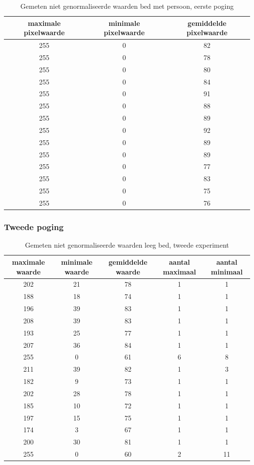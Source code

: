 \begin{table}[hbp]
	\begin{tabular}{|c|c|c|}
		\hline
		maximale pixelwaarde & minimale pixelwaarde & gemiddelde pixelwaarde \\ \hline
		255 & 0 & 82 \\ \hline
		255 & 0 & 78 \\ \hline
		255 & 0 & 80 \\ \hline
		255 & 0 & 84 \\ \hline
		255 & 0 & 91 \\ \hline
		255 & 0 & 88 \\ \hline
		255 & 0 & 89 \\ \hline
		255 & 0 & 92 \\ \hline
		255 & 0 & 89 \\ \hline
		255 & 0 & 89 \\ \hline
		255 & 0 & 77 \\ \hline
		255 & 0 & 83 \\ \hline
		255 & 0 & 75 \\ \hline
		255 & 0 & 76 \\ \hline
	\end{tabular}
	\caption{Gemeten niet genormaliseerde waarden bed met persoon, eerste poging}
	\label{refTabPZNP}
\end{table}

\subsubsection{Tweede poging}
\begin{table}[hbp]
	\begin{tabular}{|c|c|c|c|c|}
		\hline
		maximale waarde & minimale waarde & gemiddelde waarde & aantal maximaal & aantal minimaal\\ \hline
		202 & 21 & 78 & 1 & 1\\ \hline
		188 & 18 & 74 & 1 & 1\\ \hline
		196 & 39 & 83 & 1 & 1 \\ \hline
		208 & 39 & 83 & 1 & 1 \\ \hline
		193 & 25 & 77 & 1 & 1 \\ \hline
		207 & 36 & 84 & 1 & 1 \\ \hline
		255 & 0  & 61 & 6 & 8 \\ \hline
		211 & 39 & 82 & 1 & 3 \\ \hline
		182 & 9  & 73 & 1 & 1 \\ \hline
		202 & 28 & 78 & 1 & 1 \\ \hline
		185 & 10 & 72 & 1 & 1 \\ \hline
		197 & 15 & 75 & 1 & 1 \\ \hline
		174 & 3  & 67 & 1 & 1 \\ \hline
		200 & 30 & 81 & 1 & 1 \\ \hline
		255 & 0  & 60 & 2 & 11\\ \hline
	\end{tabular}
	\caption{Gemeten niet genormaliseerde waarden leeg bed, tweede experiment}
	\label{refTabPZNLT}
\end{table}

